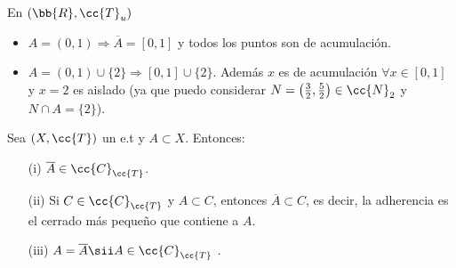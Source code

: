 \begin{ejemplo} En $(\bb{R}, \cc{T}_u)$
    \begin{itemize}
        \item $A=(0,1)\Rightarrow \overline{A}=[0,1]$ y todos los puntos son de acumulación.
        \item $A=(0,1)\cup \{2\}\Rightarrow [0,1]\cup\{2\}$. Además $x$ es de acumulación $\forall x \in [0,1]$ y $x=2$ es aislado (ya que puedo considerar $N=\left(\frac{3}{2}, \frac{5}{2}\right)\in \cc{N}_2$ y $N\cap A =\{2\}$).
    \end{itemize}
    \endsquare
\end{ejemplo}

\begin{prop}
    Sea $(X, \cc{T})$ un e.t y $A\subset X$. Entonces:
    \begin{enumerate}
        \item[(i)] $\overline{A}\in \cc{C}_{\cc{T}}$.
        \item[(ii)] Si $C\in \cc{C}_{\cc{T}}$ y $A\subset C$, entonces $\overline{A}\subset C$, es decir, la adherencia es el cerrado más pequeño que contiene a $A$. 
        \item[(iii)] $A=\overline{A}\sii A \in \cc{C}_{\cc{T}}$ .
    \end{enumerate}


\end{prop}
